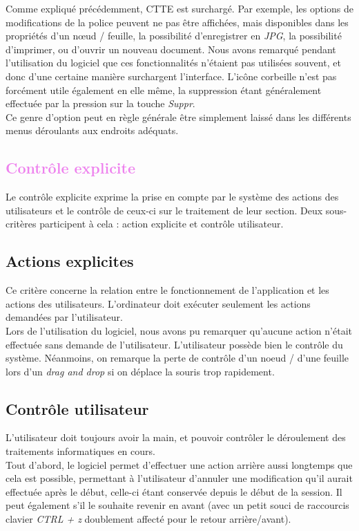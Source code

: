\documentclass[12pt, a4paper]{article}
\begin{document}
Comme expliqué précédemment, CTTE est surchargé. Par exemple, les options de modifications de la police peuvent ne pas être affichées, mais disponibles dans les propriétés d'un nœud / feuille, la possibilité d'enregistrer en \emph{JPG}, la possibilité d'imprimer, ou d'ouvrir un nouveau document. Nous avons remarqué pendant l'utilisation du logiciel que ces fonctionnalités n'étaient pas utilisées souvent, et donc d'une certaine manière surchargent l'interface. L'icône corbeille n'est pas forcément utile également en elle même, la suppression étant généralement effectuée par la pression sur la touche \emph{Suppr}. \\


Ce genre d'option peut en règle générale être simplement laissé dans les différents menus déroulants aux endroits adéquats.

\textcolor{Violet}{\section{Contrôle explicite}}
Le contrôle explicite exprime la prise en compte par le système des actions des utilisateurs et le contrôle de ceux-ci sur le traitement de leur section. Deux sous-critères participent à cela : action explicite et contrôle utilisateur.
\textcolor{NavyBlue}{\subsection{Actions explicites}}
Ce critère concerne la relation entre le fonctionnement de l'application et les actions des utilisateurs. L'ordinateur doit exécuter seulement les actions demandées par l'utilisateur.\\


Lors de l'utilisation du logiciel, nous avons pu remarquer qu'aucune action n'était effectuée sans demande de l'utilisateur. L'utilisateur possède bien le contrôle du système. Néanmoins, on remarque la perte de contrôle d'un noeud / d'une feuille lors d'un \emph{drag and drop} si on déplace la souris trop rapidement.

\textcolor{NavyBlue}{\subsection{Contrôle utilisateur}}
L'utilisateur doit toujours avoir la main, et pouvoir contrôler le déroulement des traitements informatiques en cours. \\


Tout d'abord, le logiciel permet d'effectuer une action arrière aussi longtemps que cela est possible, permettant à l'utilisateur d'annuler une modification qu'il aurait effectuée après le début, celle-ci étant conservée depuis le début de la session. Il peut également s'il le souhaite revenir en avant (avec un petit souci de raccourcis clavier \emph{CTRL + z} doublement affecté pour le retour arrière/avant).
\end{document}
